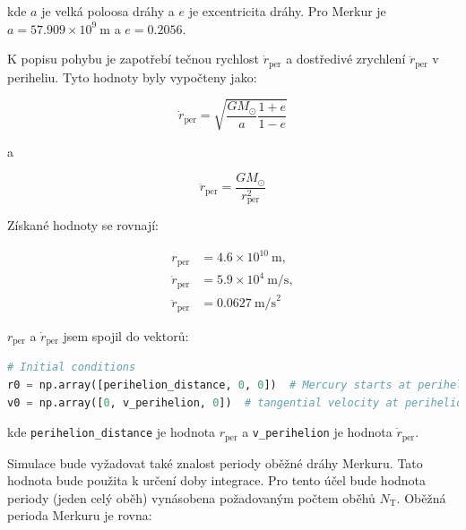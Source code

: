\documentclass[a4paper,11pt,twocolumn]{article}
\begin{document}
            kde $a$ je velká poloosa dráhy a $e$ je excentricita dráhy. Pro Merkur je $a = 57.909 \times 10^9 ~\text{m}$ a $e = 0.2056$.

            K popisu pohybu je zapotřebí tečnou rychlost $\dot{r}_{\text{per}}$ a dostředivé zrychlení $\ddot{r}_{\text{per}}$ v periheliu. Tyto hodnoty byly vypočteny jako:

            \begin{equation}
                \dot{r}_{\text{per}} = \sqrt{\frac{G M_{\odot}}{a} \frac{1 + e}{1 - e}}
                \label{eq:rdot_per}
            \end{equation}

            a

            \begin{equation}
                \ddot{r}_{\text{per}} = \frac{G M_{\odot}}{r_{\text{per}}^2}
                \label{eq:rddot_per}
            \end{equation}

            Získané hodnoty se rovnají: 

            \begin{equation*}
                \begin{aligned}
                    r_{\text{per}} &= 4.6 \times 10^{10} ~\text{m}, \\
                    \dot{r}_{\text{per}} &= 5.9 \times 10^4 ~\text{m/s}, \\
                    \ddot{r}_{\text{per}} &= 0.0627 ~\text{m/s}^2
                \end{aligned}
            \end{equation*}

            $r_{\text{per}}$ a $\dot{r}_{\text{per}}$ jsem spojil do vektorů: 

\begin{lstlisting}[language=Python, caption={Počáteční podmínky}]
# Initial conditions
r0 = np.array([perihelion_distance, 0, 0])  # Mercury starts at perihelion
v0 = np.array([0, v_perihelion, 0])  # tangential velocity at perihelion
\end{lstlisting}

            kde \texttt{perihelion\_distance} je hodnota $r_{\text{per}}$ a \texttt{v\_perihelion} je hodnota $\dot{r}_{\text{per}}$.

            Simulace bude vyžadovat také znalost periody oběžné dráhy Merkuru. Tato hodnota bude použita k určení doby integrace. Pro tento účel bude hodnota periody (jeden celý oběh) vynásobena požadovaným počtem oběhů $N_{\text{T}}$. Oběžná perioda Merkuru je rovna:
\end{document}
